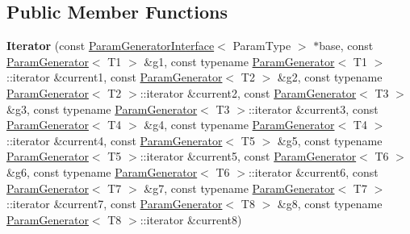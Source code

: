 \subsection*{Public Member Functions}
\begin{DoxyCompactItemize}
\item 
\mbox{\label{classtesting_1_1internal_1_1_cartesian_product_generator8_1_1_iterator_a991bb4e7f99b46eeacc77c36dbea115a}} 
{\bfseries Iterator} (const \mbox{\hyperlink{classtesting_1_1internal_1_1_param_generator_interface}{Param\+Generator\+Interface}}$<$ Param\+Type $>$ $\ast$base, const \mbox{\hyperlink{classtesting_1_1internal_1_1_param_generator}{Param\+Generator}}$<$ T1 $>$ \&g1, const typename \mbox{\hyperlink{classtesting_1_1internal_1_1_param_generator}{Param\+Generator}}$<$ T1 $>$\+::iterator \&current1, const \mbox{\hyperlink{classtesting_1_1internal_1_1_param_generator}{Param\+Generator}}$<$ T2 $>$ \&g2, const typename \mbox{\hyperlink{classtesting_1_1internal_1_1_param_generator}{Param\+Generator}}$<$ T2 $>$\+::iterator \&current2, const \mbox{\hyperlink{classtesting_1_1internal_1_1_param_generator}{Param\+Generator}}$<$ T3 $>$ \&g3, const typename \mbox{\hyperlink{classtesting_1_1internal_1_1_param_generator}{Param\+Generator}}$<$ T3 $>$\+::iterator \&current3, const \mbox{\hyperlink{classtesting_1_1internal_1_1_param_generator}{Param\+Generator}}$<$ T4 $>$ \&g4, const typename \mbox{\hyperlink{classtesting_1_1internal_1_1_param_generator}{Param\+Generator}}$<$ T4 $>$\+::iterator \&current4, const \mbox{\hyperlink{classtesting_1_1internal_1_1_param_generator}{Param\+Generator}}$<$ T5 $>$ \&g5, const typename \mbox{\hyperlink{classtesting_1_1internal_1_1_param_generator}{Param\+Generator}}$<$ T5 $>$\+::iterator \&current5, const \mbox{\hyperlink{classtesting_1_1internal_1_1_param_generator}{Param\+Generator}}$<$ T6 $>$ \&g6, const typename \mbox{\hyperlink{classtesting_1_1internal_1_1_param_generator}{Param\+Generator}}$<$ T6 $>$\+::iterator \&current6, const \mbox{\hyperlink{classtesting_1_1internal_1_1_param_generator}{Param\+Generator}}$<$ T7 $>$ \&g7, const typename \mbox{\hyperlink{classtesting_1_1internal_1_1_param_generator}{Param\+Generator}}$<$ T7 $>$\+::iterator \&current7, const \mbox{\hyperlink{classtesting_1_1internal_1_1_param_generator}{Param\+Generator}}$<$ T8 $>$ \&g8, const typename \mbox{\hyperlink{classtesting_1_1internal_1_1_param_generator}{Param\+Generator}}$<$ T8 $>$\+::iterator \&current8)
\item 

\end{DoxyCompactItemize}
